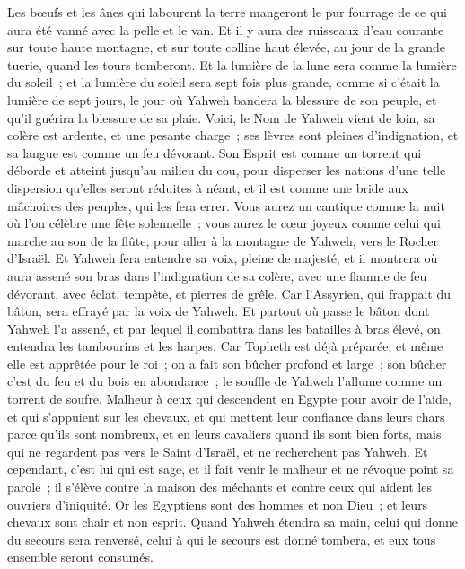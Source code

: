 \begin{multicols}{2}
Les bœufs et les ânes qui labourent la terre mangeront le pur fourrage de ce qui aura été vanné avec la pelle et le van.
Et il y aura des ruisseaux d'eau courante sur toute haute montagne, et sur toute colline haut élevée, au jour de la grande tuerie, quand les tours tomberont.
Et la lumière de la lune sera comme la lumière du soleil~; et la lumière du soleil sera sept fois plus grande, comme si c'était la lumière de sept jours, le jour où Yahweh bandera la blessure de son peuple, et qu'il guérira la blessure de sa plaie.
Voici, le Nom de Yahweh vient de loin, sa colère est ardente, et une pesante charge~; ses lèvres sont pleines d'indignation, et sa langue est comme un feu dévorant.
Son Esprit est comme un torrent qui déborde et atteint jusqu'au milieu du cou, pour disperser les nations d'une telle dispersion qu'elles seront réduites à néant, et il est comme une bride aux mâchoires des peuples, qui les fera errer.
Vous aurez un cantique comme la nuit où l'on célèbre une fête solennelle~; vous aurez le cœur joyeux comme celui qui marche au son de la flûte, pour aller à la montagne de Yahweh, vers le Rocher d'Israël.
Et Yahweh fera entendre sa voix, pleine de majesté, et il montrera où aura assené son bras dans l'indignation de sa colère, avec une flamme de feu dévorant, avec éclat, tempête, et pierres de grêle.
Car l'Assyrien, qui frappait du bâton, sera effrayé par la voix de Yahweh.
Et partout où passe le bâton dont Yahweh l'a assené, et par lequel il combattra dans les batailles à bras élevé, on entendra les tambourins et les harpes.
Car Topheth est déjà préparée, et même elle est apprêtée pour le roi~; on a fait son bûcher profond et large~; son bûcher c'est du feu et du bois en abondance~; le souffle de Yahweh l'allume comme un torrent de soufre.
\VerseOne{}Malheur à ceux qui descendent en Egypte pour avoir de l'aide, et qui s'appuient sur les chevaux, et qui mettent leur confiance dans leurs chars parce qu'ils sont nombreux, et en leurs cavaliers quand ils sont bien forts, mais qui ne regardent pas vers le Saint d'Israël, et ne recherchent pas Yahweh.
Et cependant, c'est lui qui est sage, et il fait venir le malheur et ne révoque point sa parole~; il s'élève contre la maison des méchants et contre ceux qui aident les ouvriers d'iniquité.
Or les Egyptiens sont des hommes et non Dieu~; et leurs chevaux sont chair et non esprit. Quand Yahweh étendra sa main, celui qui donne du secours sera renversé, celui à qui le secours est donné tombera, et eux tous ensemble seront consumés.

\end{multicols}
